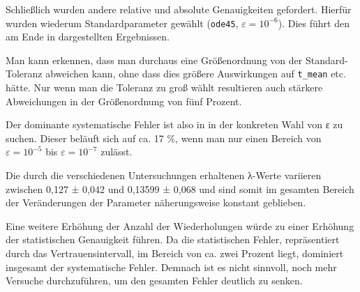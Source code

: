 Schließlich wurden andere relative und absolute Genauigkeiten gefordert. Hierfür
wurden wiederum Standardparameter gewählt (\texttt{ode45}, $ε=10^{-6}$). Dies
führt den am Ende in  dargestellten Ergebnissen.

Man kann erkennen, dass man durchaus eine Größenordnung von der Standard-Toleranz
abweichen kann, ohne dass dies größere Auswirkungen auf \texttt{t\_mean} etc.
hätte. Nur wenn man die Toleranz zu groß wählt resultieren auch stärkere
Abweichungen in der Größenordnung von fünf Prozent.

Der dominante systematische Fehler ist also in in der konkreten Wahl von ε zu
suchen. Dieser beläuft sich auf ca. 17 \%, wenn man nur einen Bereich von $ε = 
10^{-5}$ bis $ε = 10^{-7}$ zulässt.

Die durch die verschiedenen Untersuchungen erhaltenen λ-Werte variieren zwischen
0,127 ± 0,042 und 0,13599 ± 0,068 und sind somit im gesamten Bereich der
Veränderungen der Parameter näherungsweise konstant geblieben.

Eine weitere Erhöhung der Anzahl der Wiederholungen würde zu einer Erhöhung der 
statistischen Genauigkeit führen. Da die statistischen Fehler, repräsentiert
durch das Vertrauensintervall, im Bereich von ca. zwei Prozent liegt, dominiert
insgesamt der systematische Fehler. Demnach ist es nicht sinnvoll, noch mehr 
Versuche durchzuführen, um den gesamten Fehler deutlich zu senken.